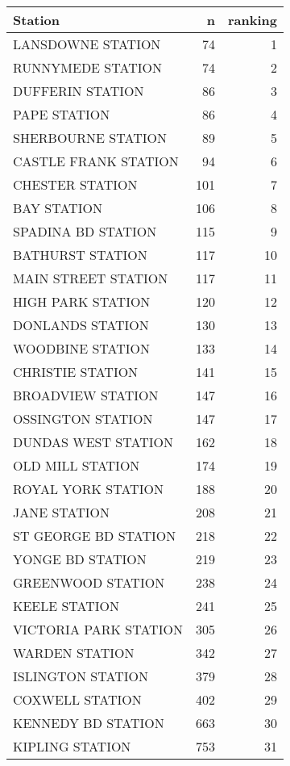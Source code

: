 \documentclass[
]{article}
\begin{document}
\begin{table}[H]
\centering
\begin{tabular}{l|r|r}
\hline
Station & n & ranking\\
\hline
LANSDOWNE STATION & 74 & 1\\
\hline
RUNNYMEDE STATION & 74 & 2\\
\hline
DUFFERIN STATION & 86 & 3\\
\hline
PAPE STATION & 86 & 4\\
\hline
SHERBOURNE STATION & 89 & 5\\
\hline
CASTLE FRANK STATION & 94 & 6\\
\hline
CHESTER STATION & 101 & 7\\
\hline
BAY STATION & 106 & 8\\
\hline
SPADINA BD STATION & 115 & 9\\
\hline
BATHURST STATION & 117 & 10\\
\hline
MAIN STREET STATION & 117 & 11\\
\hline
HIGH PARK STATION & 120 & 12\\
\hline
DONLANDS STATION & 130 & 13\\
\hline
WOODBINE STATION & 133 & 14\\
\hline
CHRISTIE STATION & 141 & 15\\
\hline
BROADVIEW STATION & 147 & 16\\
\hline
OSSINGTON STATION & 147 & 17\\
\hline
DUNDAS WEST STATION & 162 & 18\\
\hline
OLD MILL STATION & 174 & 19\\
\hline
ROYAL YORK STATION & 188 & 20\\
\hline
JANE STATION & 208 & 21\\
\hline
ST GEORGE BD STATION & 218 & 22\\
\hline
YONGE BD STATION & 219 & 23\\
\hline
GREENWOOD STATION & 238 & 24\\
\hline
KEELE STATION & 241 & 25\\
\hline
VICTORIA PARK STATION & 305 & 26\\
\hline
WARDEN STATION & 342 & 27\\
\hline
ISLINGTON STATION & 379 & 28\\
\hline
COXWELL STATION & 402 & 29\\
\hline
KENNEDY BD STATION & 663 & 30\\
\hline
KIPLING STATION & 753 & 31\\
\hline
\end{tabular}
\end{table}
\end{document}
